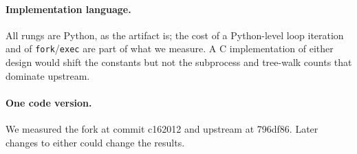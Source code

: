 \paragraph{Implementation language.} All rungs are Python, as the artifact is; the
cost of a Python-level loop iteration and of \texttt{fork}/\texttt{exec} are part of
what we measure. A C implementation of either design would shift the constants but
not the subprocess and tree-walk counts that dominate upstream.

\paragraph{One code version.} We measured the fork at commit c162012 and upstream at
796df86. Later changes to either could change the results.
